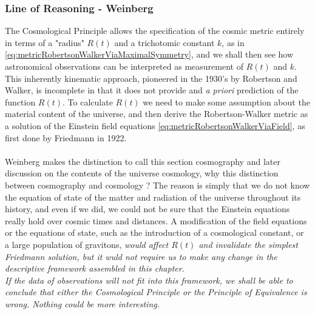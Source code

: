 	
	
	
	
	\subsubsection{Line of Reasoning - Weinberg}
	The Cosmological Principle allows the specification of the cosmic metric entirely in terms of a "radius" $R(t)$ and a trichotomic constant $k$, as in \ref{eq:metricRobertsonWalkerViaMaximalSymmetry}, and we shall then see how astronomical observations can be interpreted as measurement of $R(t)$ and $k$.\\
	This inherently kinematic approach, pioneered in the 1930's by Robertson and Walker, is incomplete in that it does not provide and \emph{a priori} prediction of the function $R(t)$. To calculate $R(t)$ we need to make some assumption about the material content of the universe, and then derive the Robertson-Walker metric as a solution of the Einstein field equations \ref{eq:metricRobertsonWalkerViaField}, as first done by Friedmann in 1922.\\
	\\
	Weinberg makes the distinction to call this section cosmography and later discussion on the contents of the universe cosmology, why this distinction between cosmography and cosmology ? The reason is simply that we do not know the equation of state of the matter and radiation of the universe throughout its history, and even if we did, we could not be sure that the Einstein equations really hold over cosmic times and distances. A modification of the field equations or the equations of state, such as the introduction of a cosmological constant, or a large population of gravitons, \emph{would affect $R(t)$ and invalidate the simplest Friedmann solution, but it wuld not require us to make any change in the descriptive framework assembled in this chapter}.\\
	\emph{If the data of observations will not fit into this framework, we shall be able to conclude that either the Cosmological Principle or the Principle of Equivalence is wrong. Nothing could be more interesting.}
	
	
	
	
	
	
	
	
